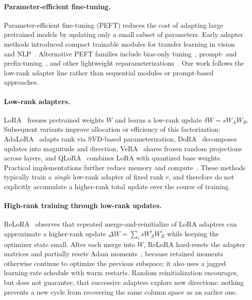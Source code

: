\paragraph{Parameter-efficient fine-tuning.}
Parameter-efficient fine-tuning (PEFT) reduces the cost of adapting large pretrained models by updating only a small subset of parameters.
Early adapter methods introduced compact trainable modules for transfer learning in vision~\cite{rebuffi2017,rebuffi2018} and NLP~\cite{houlsby2019,pfeiffer2021}.
Alternative PEFT families include bias-only tuning~\cite{benzaken2022}, prompt- and prefix-tuning~\cite{lester2021,li2021}, and other lightweight reparameterizations~\cite{he2022}.
Our work follows the low-rank adapter line rather than sequential modules or prompt-based approaches.

\paragraph{Low-rank adapters.}
LoRA~\cite{hu2021lora} freezes pretrained weights $W$ and learns a low-rank update $\delta W = s W_A W_B$.
Subsequent variants improve allocation or efficiency of this factorization: AdaLoRA~\cite{zhang2023} adapts rank via SVD-based parameterization, DoRA~\cite{liu2024dora} decomposes updates into magnitude and direction, VeRA~\cite{kopiczko2024vera} shares frozen random projections across layers, and QLoRA~\cite{dettmers2023} combines LoRA with quantized base weights.
Practical implementations further reduce memory and compute~\cite{cherniuk2023,dettmers2023}.
These methods typically train a \emph{single} low-rank adapter of fixed rank $r$, and therefore do not explicitly accumulate a higher-rank total update over the course of training.

\paragraph{High-rank training through low-rank updates.}
ReLoRA~\cite{lialin2023stack} observes that repeated merge-and-reinitialize of LoRA adapters can approximate a higher-rank update
$\Delta W = \sum_{i} s W_A^{i} W_B^{i}$
while keeping the optimizer state small.
After each merge into $W$, ReLoRA hard-resets the adapter matrices and partially resets Adam moments~\cite{kingma2017adam}, because retained moments otherwise continue to optimize the previous subspace; it also uses a jagged learning-rate schedule with warm restarts.
Random reinitialization encourages, but does not guarantee, that successive adapters explore new directions: nothing prevents a new cycle from recovering the same column space as an earlier one.

